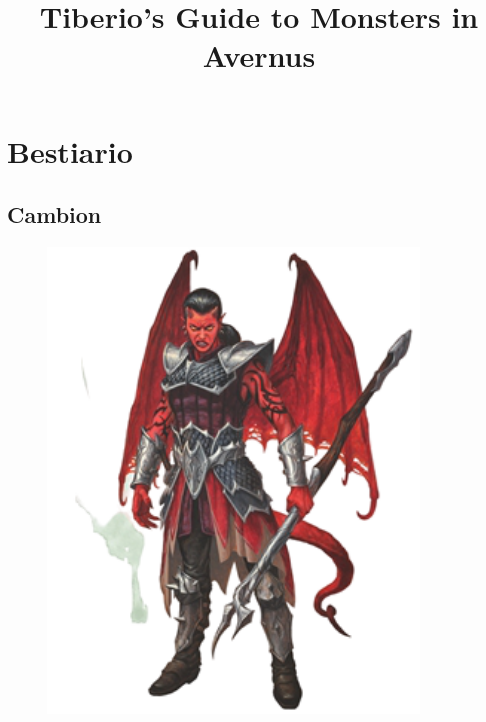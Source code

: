 \documentclass[oneside]{clgrammar}
\title{Tiberio's Guide to Monsters in Avernus}
\author{}
\begin{document}
\setmainfont{[Modesto Condensed Bold.ttf]}
\maketitle
\frontmatter
\tableofcontents

\mainmatter
\chapter{Bestiario}
\section{Cambion}
\begin{figure}[h!]
\centering
\includegraphics[width=280pt]{images/monstros/cambion-removebg-preview.png}
\end{figure}
\newpage
\end{document}
